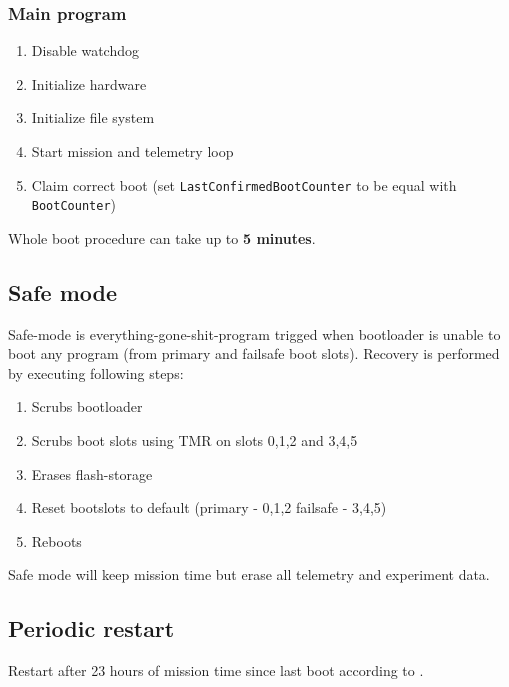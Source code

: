 \subsubsection{Main \obc program}
\begin{enumerate}
	\item Disable watchdog
	\item Initialize hardware 
	\item Initialize file system
	\item Start mission and telemetry loop
	\item Claim correct boot (set \texttt{LastConfirmedBootCounter} to be equal with \texttt{BootCounter})
\end{enumerate}

Whole \obc boot procedure can take up to \textbf{5 minutes}. 

\subsection{Safe mode}
Safe-mode is everything-gone-shit-program trigged when bootloader is unable to boot any program (from primary and failsafe boot slots). Recovery is performed by executing following steps:
\begin{enumerate}
	\item Scrubs bootloader
	\item Scrubs boot slots using TMR on slots 0,1,2 and 3,4,5
	\item Erases flash-storage
	\item Reset bootslots to default (primary - 0,1,2 failsafe - 3,4,5)
	\item Reboots
\end{enumerate}

Safe mode will keep mission time but erase all telemetry and experiment data. 


\subsection{Periodic restart}
Restart after 23 hours of mission time since last boot according to . 
